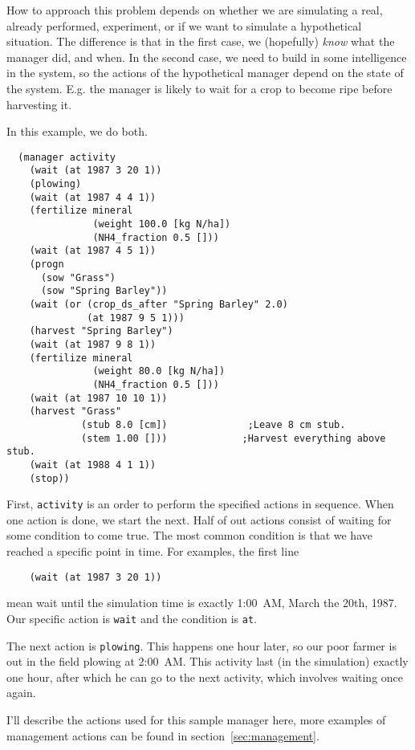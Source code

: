 \documentclass[a4paper,11pt]{article}
\begin{document}
How to approach this problem depends on whether we are simulating a
real, already performed, experiment, or if we want to simulate a
hypothetical situation.  The difference is that in the first case, we
(hopefully) \emph{know} what the manager did, and when.  In the second
case, we need to build in some intelligence in the system, so the
actions of the hypothetical manager depend on the state of the system.
E.g. the manager is likely to wait for a crop to become ripe before
harvesting it.

In this example, we do both.

\begin{verbatim}
  (manager activity
    (wait (at 1987 3 20 1))
    (plowing)
    (wait (at 1987 4 4 1))
    (fertilize mineral
               (weight 100.0 [kg N/ha])
               (NH4_fraction 0.5 []))
    (wait (at 1987 4 5 1))
    (progn
      (sow "Grass")
      (sow "Spring Barley"))
    (wait (or (crop_ds_after "Spring Barley" 2.0)
              (at 1987 9 5 1)))
    (harvest "Spring Barley")
    (wait (at 1987 9 8 1))
    (fertilize mineral
               (weight 80.0 [kg N/ha])
               (NH4_fraction 0.5 []))
    (wait (at 1987 10 10 1))
    (harvest "Grass"
             (stub 8.0 [cm])              ;Leave 8 cm stub.
             (stem 1.00 []))             ;Harvest everything above stub.
    (wait (at 1988 4 1 1))
    (stop))
\end{verbatim}

First, \texttt{activity} is an order to perform the specified actions
in sequence.  When one action is done, we start the next.  Half of out
actions consist of waiting for some condition to come true.  The most
common condition is that we have reached a specific point in time.
For examples, the first line

\begin{verbatim}
    (wait (at 1987 3 20 1))
\end{verbatim}

mean wait until the simulation time is exactly 1:00~AM, March the
20th, 1987.  Our specific action is \texttt{wait} and the condition is
\texttt{at}.

The next action is \texttt{plowing}.  This happens one hour later, so
our poor farmer is out in the field plowing at 2:00~AM.  This activity
last (in the simulation) exactly one hour, after which he can go to
the next activity, which involves waiting once again.

I'll describe the actions used for this sample manager here, more
examples of management actions can be found in
section~\ref{sec:management}.
\end{document}
